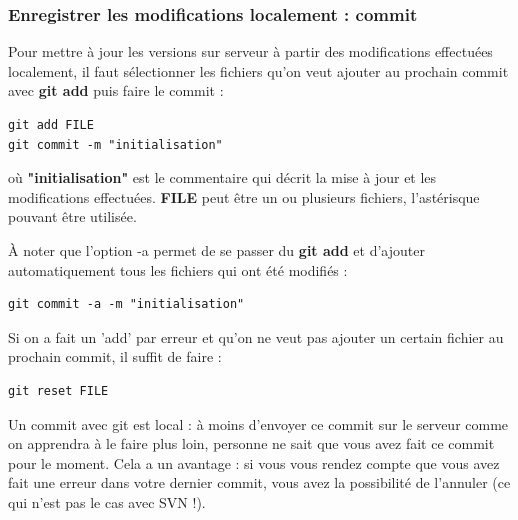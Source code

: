 \documentclass[a4paper,twoside]{article}
\begin{document}
\subsubsection{Enregistrer les modifications localement : commit}\label{sec:commit}

Pour mettre à jour les versions sur serveur à partir des modifications effectuées localement, il faut sélectionner les fichiers qu'on veut ajouter au prochain commit avec \textbf{git add} puis faire le commit :
\begin{verbatim}
git add FILE
git commit -m "initialisation"
\end{verbatim}
où \textbf{"initialisation"} est le commentaire qui décrit la mise à jour et les modifications effectuées. \textbf{FILE} peut être un ou plusieurs fichiers, l'astérisque pouvant être utilisée.

À noter que l'option -a permet de se passer du \textbf{git add} et d'ajouter automatiquement tous les fichiers qui ont été modifiés :
 \begin{verbatim}
git commit -a -m "initialisation"
\end{verbatim}

\begin{remarque}
Si on a fait un 'add' par erreur et qu'on ne veut pas ajouter un certain fichier au prochain commit, il suffit de faire :
\begin{verbatim}
git reset FILE
\end{verbatim}
\end{remarque}

\bigskip

\begin{attention}
Un commit avec git est local : à moins d'envoyer ce commit sur le serveur comme on apprendra à le faire plus loin, personne ne sait que vous avez fait ce commit pour le moment. Cela a un avantage : si vous vous rendez compte que vous avez fait une erreur dans votre dernier commit, vous avez la possibilité de l'annuler (ce qui n'est pas le cas avec SVN !).
\end{attention}
\end{document}
